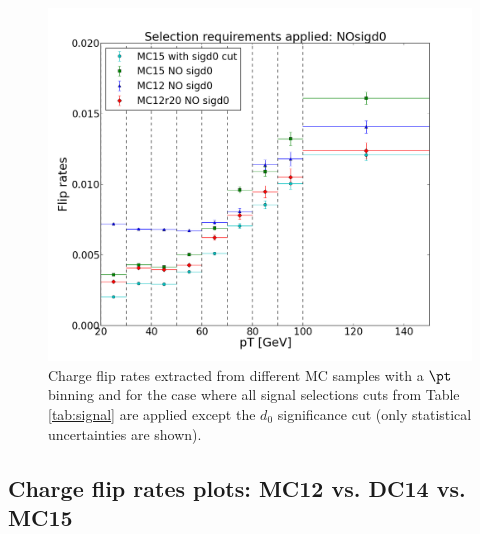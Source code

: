 \begin{figure}[htb!]
\centering
\includegraphics[width=0.5\linewidth]{FIGURES/BKG/chargeFlip/APPENDIX/fliprates_pT_NOsigd0.png}
\caption{\label{fig:nosigd0} Charge flip rates extracted from different MC samples with a $\pt$ binning and for the case where all signal selections cuts  from Table \ref{tab:signal} are applied except the $d_0$ significance cut (only statistical uncertainties are shown).}
\end{figure}


\FloatBarrier

\subsection{Charge flip rates plots: MC12 vs. DC14 vs. MC15}
\label{app:CFrates1}

